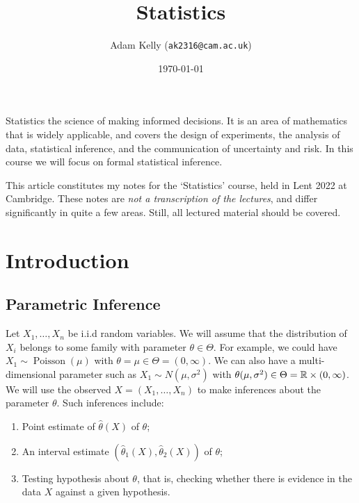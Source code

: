 \documentclass[a4paper]{scrartcl}
\title{Statistics}
\author{Adam Kelly (\texttt{ak2316@cam.ac.uk})}
\date{\today}
\begin{document}
\maketitle


Statistics the science of making informed decisions. It is an area of mathematics that is widely applicable, and covers the design of experiments, the analysis of data, statistical inference, and the communication of uncertainty and risk.
In this course we will focus on formal statistical inference.


This article constitutes my notes for the `Statistics' course, held in Lent 2022 at Cambridge. These notes are \emph{not a transcription of the lectures}, and differ significantly in quite a few areas. Still, all lectured material should be covered.


\tableofcontents

\section{Introduction}

\subsection{Parametric Inference}

Let $X_1, \dots, X_n$ be i.i.d random variables. We will assume that the distribution of $X_i$ belongs to some family with parameter $\theta \in \Theta$.
For example, we could have $X_1 \sim \operatorname{Poisson}(\mu)$ with $\theta = \mu \in \Theta = (0, \infty)$. We can also have a multi-dimensional parameter such as $X_1 \sim N(\mu, \sigma^2)$ with $\theta(\mu, \sigma^2) \in \Theta = \mathbb{R} \times (0, \infty)$.
We will use the observed $X = (X_1, \dots, X_n)$ to make inferences about the parameter $\theta$. Such inferences include:

\begin{enumerate}
  \item Point estimate of $\hat{\theta}(X)$ of $\theta$;
  \item An interval estimate $(\hat{\theta}_1(X), \hat{\theta}_2(X))$ of $\theta$;
  \item Testing hypothesis about $\theta$, that is, checking whether there is evidence in the data $X$ against a given hypothesis.
\end{enumerate}
\end{document}
